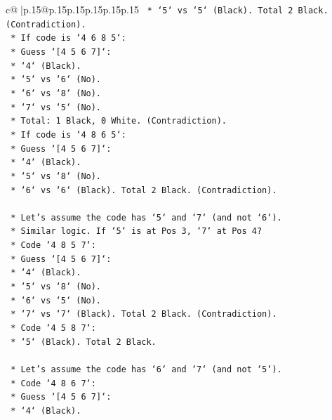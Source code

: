 \documentclass{article}
\begin{document}
{\begin{supertabular}{c@{$\;$}|p{.15\linewidth}@{}p{.15\linewidth}p{.15\linewidth}p{.15\linewidth}p{.15\linewidth}p{.15\linewidth}}
{{{\texttt{                *   `5` vs `5` (Black). Total 2 Black. (Contradiction).} \\
\texttt{        *   If code is `4 6 8 5`:} \\
\texttt{            *   Guess `{[}4 5 6 7{]}`:} \\
\texttt{                *   `4` (Black).} \\
\texttt{                *   `5` vs `6` (No).} \\
\texttt{                *   `6` vs `8` (No).} \\
\texttt{                *   `7` vs `5` (No).} \\
\texttt{                *   Total: 1 Black, 0 White. (Contradiction).} \\
\texttt{        *   If code is `4 8 6 5`:} \\
\texttt{            *   Guess `{[}4 5 6 7{]}`:} \\
\texttt{                *   `4` (Black).} \\
\texttt{                *   `5` vs `8` (No).} \\
\texttt{                *   `6` vs `6` (Black). Total 2 Black. (Contradiction).} \\
\\ 
\texttt{    *   Let's assume the code has `5` and `7` (and not `6`).} \\
\texttt{        *   Similar logic. If `5` is at Pos 3, `7` at Pos 4?} \\
\texttt{        *   Code `4 8 5 7`:} \\
\texttt{            *   Guess `{[}4 5 6 7{]}`:} \\
\texttt{                *   `4` (Black).} \\
\texttt{                *   `5` vs `8` (No).} \\
\texttt{                *   `6` vs `5` (No).} \\
\texttt{                *   `7` vs `7` (Black). Total 2 Black. (Contradiction).} \\
\texttt{        *   Code `4 5 8 7`:} \\
\texttt{            *   `5` (Black). Total 2 Black.} \\
\\ 
\texttt{    *   Let's assume the code has `6` and `7` (and not `5`).} \\
\texttt{        *   Code `4 8 6 7`:} \\
\texttt{            *   Guess `{[}4 5 6 7{]}`:} \\
\texttt{                *   `4` (Black).} \\
}}}
\end{supertabular}}
\end{document}
